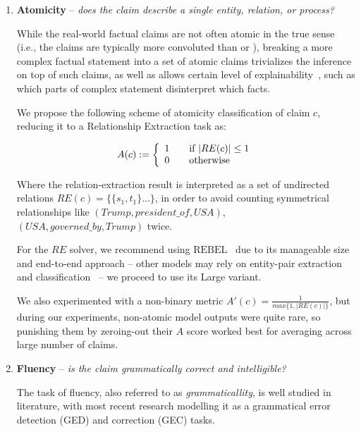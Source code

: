 \begin{enumerate}
    \item \textbf{Atomicity} -- \textit{does the claim describe a single entity, relation, or process?}

    While the real-world factual claims are not often atomic in the true sense (i.e., the claims are typically more convoluted than  or ), breaking a more complex factual statement into a set of atomic claims trivializes the inference on top of such claims, as well as allows certain level of explainability~\cite{dammu-etal-2024-claimver}, such as which parts of complex statement disinterpret which facts.
    
    We propose the following scheme of atomicity classification of claim $c$, reducing it to a Relationship Extraction task as:

    $$A(c) := \left\{ 
        \begin{array}{ c l }
            1 & \quad \textrm{if } |RE(c)| \leq 1 \\
            0                 & \quad \textrm{otherwise}
        \end{array}
    \right.$$

    Where the relation-extraction result is interpreted as a set of undirected relations $RE(c) = \{\{s_1,t_1\}\dots\}$, in order to avoid counting symmetrical relationships like $(Trump, president\_of, USA)$, $(USA, governed\_by, Trump)$ twice.

    For the $RE$ solver, we recommend using $\textrm{REBEL}$~\cite{huguet-cabot-navigli-2021-rebel-relation} due to its manageable size and end-to-end approach -- other models may rely on entity-pair extraction and classification~\cite{yamada-etal-2020-luke} -- we proceed to use its Large variant.

    We also experimented with a non-binary metric $A'(c)=\frac{1}{max\{1,|RE(c)|\}}$, but during our experiments, non-atomic model outputs were quite rare, so punishing them by zeroing-out their $A$ score worked best for averaging across large number of claims.

    \item \textbf{Fluency} -- \textit{is the claim grammatically correct and intelligible?}
    
    The task of fluency, also referred to as \textit{grammaticallity}, is well studied in literature, with most recent research modelling it as a grammatical error detection (GED) and correction (GEC) tasks.
    

\end{enumerate}
